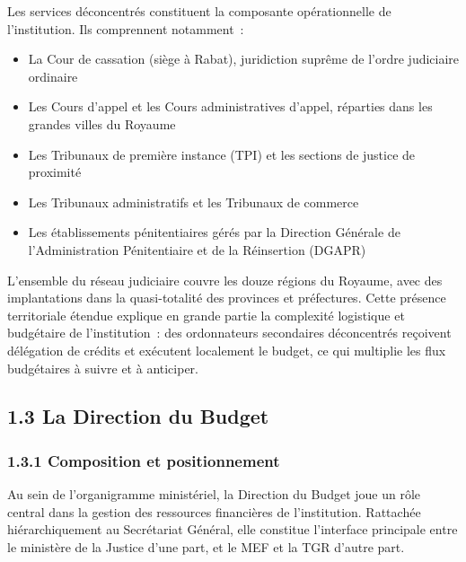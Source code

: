 Les services d\'econcentr\'es constituent la composante op\'erationnelle de l'institution. Ils comprennent notamment~:

\begin{itemize}
    \item La Cour de cassation (si\`ege \`a Rabat), juridiction supr\^eme de l'ordre judiciaire ordinaire
    \item Les Cours d'appel et les Cours administratives d'appel, r\'eparties dans les grandes villes du Royaume
    \item Les Tribunaux de premi\`ere instance (TPI) et les sections de justice de proximit\'e
    \item Les Tribunaux administratifs et les Tribunaux de commerce
    \item Les \'etablissements p\'enitentiaires g\'er\'es par la Direction G\'en\'erale de l'Administration P\'enitentiaire et de la R\'einsertion (DGAPR)
\end{itemize}

L'ensemble du r\'eseau judiciaire couvre les douze r\'egions du Royaume, avec des implantations dans la quasi-totalit\'e des provinces et pr\'efectures. Cette pr\'esence territoriale \'etendue explique en grande partie la complexit\'e logistique et budg\'etaire de l'institution~: des ordonnateurs secondaires d\'econcentr\'es re\c{c}oivent d\'el\'egation de cr\'edits et ex\'ecutent localement le budget, ce qui multiplie les flux budg\'etaires \`a suivre et \`a anticiper.

\label{sec:direction-budget}
\subsection*{1.3 \quad La Direction du Budget}

\subsubsection*{1.3.1 \quad Composition et positionnement}

Au sein de l'organigramme minist\'eriel, la Direction du Budget joue un r\^ole central dans la gestion des ressources financi\`eres de l'institution. Rattach\'ee hi\'erarchiquement au Secr\'etariat G\'en\'eral, elle constitue l'interface principale entre le minist\`ere de la Justice d'une part, et le MEF et la TGR d'autre part.

